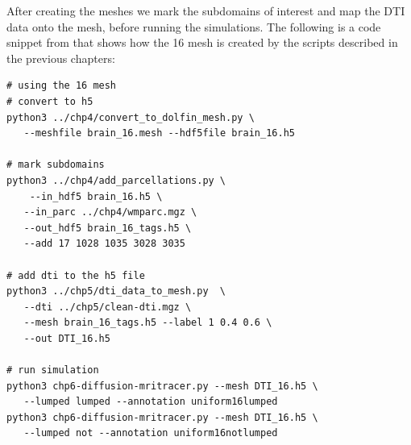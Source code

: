 After creating the meshes we mark the subdomains of interest and map the DTI data onto the mesh, before 
running the simulations. The following is a code snippet from  that shows how
the 16 mesh is created by the scripts described in the previous chapters: 
\begin{lstlisting}[style=bashStyle]
# using the 16 mesh 
# convert to h5
python3 ../chp4/convert_to_dolfin_mesh.py \
   --meshfile brain_16.mesh --hdf5file brain_16.h5

# mark subdomains  
python3 ../chp4/add_parcellations.py \
    --in_hdf5 brain_16.h5 \
   --in_parc ../chp4/wmparc.mgz \
   --out_hdf5 brain_16_tags.h5 \
   --add 17 1028 1035 3028 3035

# add dti to the h5 file 
python3 ../chp5/dti_data_to_mesh.py  \
   --dti ../chp5/clean-dti.mgz \
   --mesh brain_16_tags.h5 --label 1 0.4 0.6 \
   --out DTI_16.h5 

# run simulation 
python3 chp6-diffusion-mritracer.py --mesh DTI_16.h5 \
   --lumped lumped --annotation uniform16lumped 
python3 chp6-diffusion-mritracer.py --mesh DTI_16.h5 \
   --lumped not --annotation uniform16notlumped 
\end{lstlisting}


